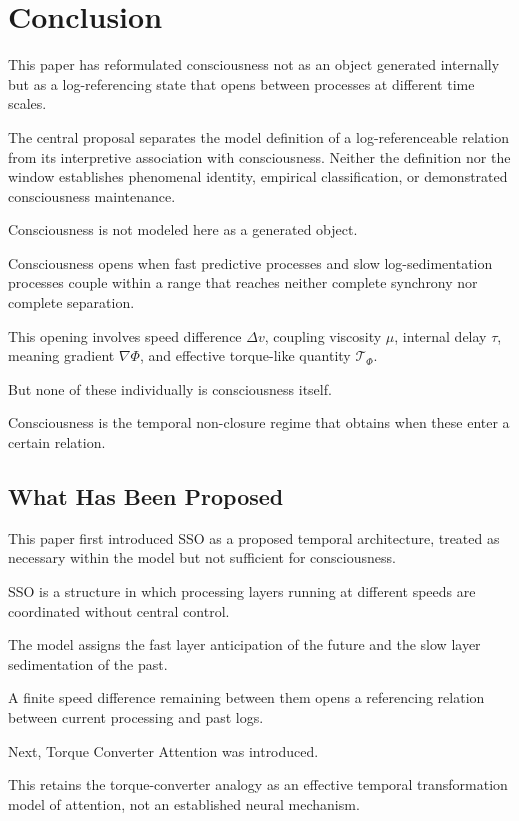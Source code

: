 \section{Conclusion}


This paper has reformulated consciousness not as an object generated internally but as a log-referencing state that opens between processes at different time scales.

The central proposal separates the model definition of a log-referenceable relation from its interpretive association with consciousness. Neither the definition nor the window establishes phenomenal identity, empirical classification, or demonstrated consciousness maintenance.

Consciousness is not modeled here as a generated object.

Consciousness opens when fast predictive processes and slow log-sedimentation processes couple within a range that reaches neither complete synchrony nor complete separation.


This opening involves speed difference $\Delta v$, coupling viscosity $\mu$, internal delay $\tau$, meaning gradient $\nabla\Phi$, and effective torque-like quantity $\mathcal{T}_{\Phi}$.

But none of these individually is consciousness itself.

Consciousness is the temporal non-closure regime that obtains when these enter a certain relation.

\subsection{What Has Been Proposed}


This paper first introduced SSO as a proposed temporal architecture, treated as necessary within the model but not sufficient for consciousness.

SSO is a structure in which processing layers running at different speeds are coordinated without central control.

The model assigns the fast layer anticipation of the future and the slow layer sedimentation of the past.

A finite speed difference remaining between them opens a referencing relation between current processing and past logs.

Next, Torque Converter Attention was introduced.

This retains the torque-converter analogy as an effective temporal transformation model of attention, not an established neural mechanism.

